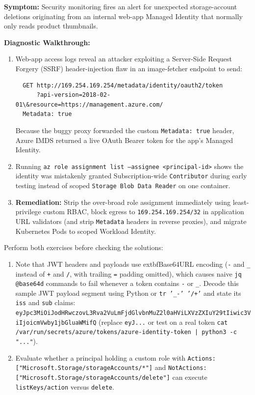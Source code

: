\begin{realworldbox}
\textbf{Symptom:} Security monitoring fires an alert for unexpected storage-account deletions originating from an internal web-app Managed Identity that normally only reads product thumbnails.

\textbf{Diagnostic Walkthrough:}
\begin{enumerate}[leftmargin=12pt]
  \item Web-app access logs reveal an attacker exploiting a Server-Side Request Forgery (SSRF) header-injection flaw in an image-fetcher endpoint to send:
  \begin{verbatim}
  GET http://169.254.169.254/metadata/identity/oauth2/token
      ?api-version=2018-02-01\&resource=https://management.azure.com/
  Metadata: true
  \end{verbatim}
  Because the buggy proxy forwarded the custom \texttt{Metadata: true} header, Azure IMDS returned a live OAuth Bearer token for the app's Managed Identity.
  \item Running \texttt{az role assignment list --assignee <principal-id>} shows the identity was mistakenly granted Subscription-wide \texttt{Contributor} during early testing instead of scoped \texttt{Storage Blob Data Reader} on one container.
  \item \textbf{Remediation:} Strip the over-broad role assignment immediately using least-privilege custom RBAC, block egress to \texttt{169.254.169.254/32} in application URL validators (and strip \texttt{Metadata} headers in reverse proxies), and migrate Kubernetes Pods to scoped Workload Identity.
\end{enumerate}
\end{realworldbox}

\begin{tryityourselfbox}
Perform both exercises before checking the solutions:
\begin{enumerate}[leftmargin=12pt]
  \item Note that JWT headers and payloads use 	extbf{Base64URL} encoding (\texttt{-} and \texttt{\_} instead of \texttt{+} and \texttt{/}, with trailing \texttt{=} padding omitted), which causes naive \texttt{jq @base64d} commands to fail whenever a token contains \texttt{-} or \texttt{\_}. Decode this sample JWT payload segment using Python or \texttt{tr '\_-' '/+'} and state its \texttt{iss} and \texttt{sub} claims:\\
  \texttt{eyJpc3MiOiJodHRwczovL3Rva2VuLmFjdGlvbnMuZ2l0aHViLXVzZXIuY29tIiwic3ViIjoicmVwby1jbGluaWMifQ} (replace \texttt{eyJ...} or test on a real token \texttt{cat /var/run/secrets/azure/tokens/azure-identity-token | python3 -c "..."}).
  \item Evaluate whether a principal holding a custom role with \texttt{Actions: ["Microsoft.Storage/storageAccounts/*"]} and \texttt{NotActions: ["Microsoft.Storage/storageAccounts/delete"]} can execute \texttt{listKeys/action} versus \texttt{delete}.
\end{enumerate}
\end{tryityourselfbox}

